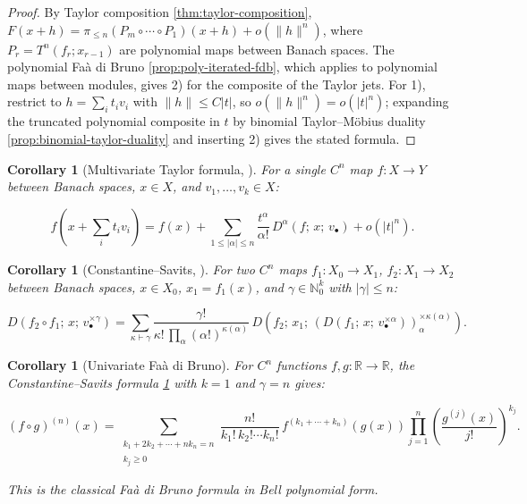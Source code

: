 \documentclass[10pt,a4paper]{article}
\theoremstyle{plain}
\newtheorem{corollary}[theorem]{Corollary}
\theoremstyle{definition}
\newcommand{\IR}{\mathbb{R}} %
\newcommand{\IN}{\mathbb{N}} %
\newcommand{\1}{\mathbb{1}} %
\begin{document}
\begin{proof}

By Taylor composition \ref{thm:taylor-composition},
\(F(x + h) = \pi_{\leq n}(P_m \circ \cdots \circ P_1)(x + h) + o(\|h\|^n)\),
where \(P_r = T^n(f_r; x_{r-1})\) are polynomial maps between Banach
spaces. The polynomial Faà di Bruno \ref{prop:poly-iterated-fdb}, which
applies to polynomial maps between modules, gives 2) for the composite
of the Taylor jets. For 1), restrict to \(h = \sum_i t_i v_i\) with
\(\|h\| \leq C|t|\), so \(o(\|h\|^n) = o(|t|^n)\); expanding the
truncated polynomial composite in \(t\) by binomial Taylor--Möbius
duality \ref{prop:binomial-taylor-duality} and inserting 2) gives the
stated formula.

\end{proof}

\begin{corollary}[Multivariate Taylor formula, \citep{LangRFA}]

\label{cor:multivariate-taylor} For a single \(C^n\) map \(f: X \to Y\)
between Banach spaces, \(x \in X\), and \(v_1, \dots, v_k \in X\):

\[
  f(x + {\textstyle\sum_i} t_i v_i) = f(x) + \sum_{1 \leq |\alpha| \leq n} \frac{t^\alpha}{\alpha!}\, D^\alpha(f;\, x;\, v_\bullet) + o(|t|^n).
\]

\end{corollary}

\begin{corollary}[Constantine--Savits, \citep{CS1996}]

\label{cor:cs} For two \(C^n\) maps \(f_1: X_0 \to X_1\),
\(f_2: X_1 \to X_2\) between Banach spaces, \(x \in X_0\),
\(x_1 = f_1(x)\), and \(\gamma \in \IN_0^k\) with \(|\gamma| \leq n\):

\[
  D(f_2 \circ f_1;\, x;\, v_\bullet^{\times \gamma}) = \sum_{\kappa \vdash \gamma} \frac{\gamma!}{\kappa!\, \prod_\alpha (\alpha!)^{\kappa(\alpha)}}\, D(f_2;\, x_1;\, (D(f_1;\, x;\, v_\bullet^{\times \alpha}))_\alpha^{\times \kappa(\alpha)}).
\]

\end{corollary}

\begin{corollary}[Univariate Faà di Bruno]

\label{cor:univariate-fdb} For \(C^n\) functions \(f, g: \IR \to \IR\),
the Constantine--Savits formula \ref{cor:cs} with \(k = 1\) and
\(\gamma = n\) gives:

\[
  (f \circ g)^{(n)}(x) = \sum_{\substack{k_1 + 2k_2 + \cdots + nk_n = n \\\\ k_j \geq 0}} \frac{n!}{k_1!\, k_2! \cdots k_n!}\, f^{(k_1 + \cdots + k_n)}(g(x)) \prod_{j=1}^n \left(\frac{g^{(j)}(x)}{j!}\right)^{k_j}.
\]

This is the classical Faà di Bruno formula in Bell polynomial form.

\end{corollary}
\end{document}
